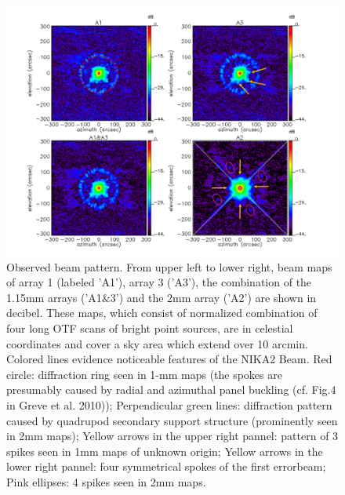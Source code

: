 \documentclass[]{aa} %
\begin{document}
\begin{figure}[h]
   \centering
    \includegraphics[width=0.9\linewidth]{Beams_features.pdf}
     
      \caption{Observed beam pattern. From upper left to lower right,
        beam maps of array 1 (labeled 'A1'), array 3 ('A3'), the
        combination of the 1.15mm arrays ('A1$\&$3') and the 2mm array
        ('A2') are shown in decibel. These maps, which consist of
        normalized combination of four long OTF scans of bright point
        sources, are in celestial coordinates and cover a sky area
        which extend over 10 arcmin. Colored lines evidence noticeable
        features of the NIKA2 Beam. Red circle: diffraction ring seen
        in 1-mm maps (the spokes are presumably caused by radial and
        azimuthal panel buckling (cf. Fig.4 in Greve et al. 2010));
        Perpendicular green lines: diffraction pattern caused by
        quadrupod secondary support structure (prominently seen in 2mm
        maps); Yellow arrows in the upper right pannel: pattern of 3
        spikes seen in 1mm maps of unknown origin; Yellow arrows in
        the lower right pannel: four symmetrical spokes of the first
        errorbeam; Pink ellipses: 4 spikes seen in 2mm maps.
      }
         \label{fig:beampattern}
\end{figure}
\end{document}
